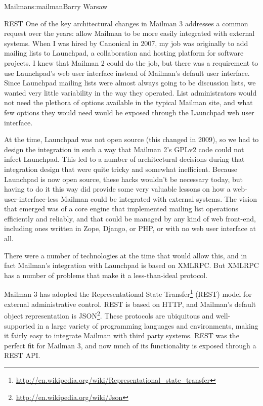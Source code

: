 \begin{aosachapter}{Mailman}{s:mailman}{Barry Warsaw}
\begin{aosasect1}{REST}
One of the key architectural changes in Mailman 3 addresses a common
request over the years: allow Mailman to be more easily integrated
with external systems.  When I was hired by Canonical in 2007, my job
was originally to add mailing lists to Launchpad, a collaboration and
hosting platform for software projects.  I knew that Mailman
2 could do the job, but there was a requirement to use Launchpad's web
user interface instead of Mailman's default user interface.  Since
Launchpad mailing lists were almost always going to be discussion
lists, we wanted very little variability in the way they operated.
List administrators would not need the plethora of options available
in the typical Mailman site, and what few options they would need
would be exposed through the Launchpad web user interface.

At the time, Launchpad was not open source (this changed in 2009), so
we had to design the integration in such a way that Mailman 2's GPLv2
code could not infect Launchpad.  This led to a number of
architectural decisions during that integration design that were quite
tricky and somewhat inefficient.  Because Launchpad is now open
source, these hacks wouldn't be necessary today, but having to do it
this way did provide some very valuable lessons on how a 
web-user-interface-less Mailman could be integrated with external systems.  The
vision that emerged was of a core engine that implemented mailing list
operations efficiently and reliably, and that could be managed by any
kind of web front-end, including ones written in Zope, Django, or PHP,
or with no web user interface at all.

There were a number of technologies at the time that would allow this,
and in fact Mailman's integration with Launchpad is based on XMLRPC.
But XMLRPC has a number of problems that make it a less-than-ideal
protocol.

Mailman 3 has adopted the Representational State
Transfer\footnote{\url{http://en.wikipedia.org/wiki/Representational_state_transfer}}
(REST) model for external administrative control.  REST is based on
HTTP, and Mailman's default object representation is
JSON\footnote{\url{http://en.wikipedia.org/wiki/Json}}.  These
protocols are ubiquitous and well-supported in a large variety of
programming languages and environments, making it fairly easy to
integrate Mailman with third party systems.  REST was the perfect fit
for Mailman 3, and now much of its functionality is exposed through a
REST API.


\end{aosasect1}
\end{aosachapter}
